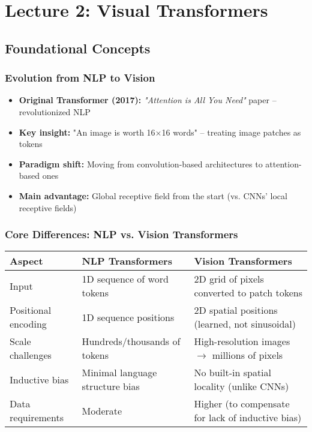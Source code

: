 \chapter{\normalsize Lecture 2: Visual Transformers}

\section{Foundational Concepts}

\subsection*{Evolution from NLP to Vision}
\begin{itemize}
    \item \textbf{Original Transformer (2017):} \textit{"Attention is All You Need"} paper – revolutionized NLP
    \item \textbf{Key insight:} "An image is worth 16$\times$16 words" – treating image patches as tokens
    \item \textbf{Paradigm shift:} Moving from convolution-based architectures to attention-based ones
    \item \textbf{Main advantage:} Global receptive field from the start (vs. CNNs' local receptive fields)
\end{itemize}

\subsection*{Core Differences: NLP vs. Vision Transformers}

\begin{center}
\begin{tabular}{|l|l|l|}
\hline
\textbf{Aspect} & \textbf{NLP Transformers} & \textbf{Vision Transformers} \\
\hline
Input & 1D sequence of word tokens & 2D grid of pixels converted to patch tokens \\
\hline
Positional encoding & 1D sequence positions & 2D spatial positions (learned, not sinusoidal) \\
\hline
Scale challenges & Hundreds/thousands of tokens & High-resolution images $\rightarrow$ millions of pixels \\
\hline
Inductive bias & Minimal language structure bias & No built-in spatial locality (unlike CNNs) \\
\hline
Data requirements & Moderate & Higher (to compensate for lack of inductive bias) \\
\hline
\end{tabular}
\end{center}

